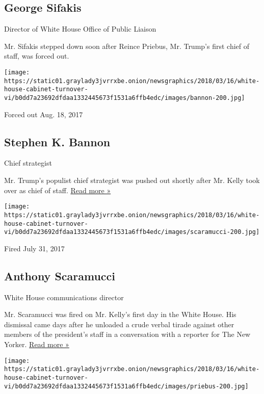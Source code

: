 \hypertarget{george-sifakis}{%
\subsection{George Sifakis}\label{george-sifakis}}

Director of White House Office of Public Liaison

Mr. Sifakis stepped down soon after Reince Priebus, Mr. Trump's first
chief of staff, was forced out.

\texttt{[image: https://static01.graylady3jvrrxbe.onion/newsgraphics/2018/03/16/white-house-cabinet-turnover-vi/b0dd7a23692dfdaa1332445673f1531a6ffb4edc/images/bannon-200.jpg]}

Forced out Aug. 18, 2017

\hypertarget{stephen-k-bannon}{%
\subsection{Stephen K. Bannon}\label{stephen-k-bannon}}

Chief strategist

Mr. Trump's populist chief strategist was pushed out shortly after Mr.
Kelly took over as chief of staff.
\href{https://www.nytimes3xbfgragh.onion/2017/08/18/us/politics/steve-bannon-trump-white-house.html}{Read
more »}

\texttt{[image: https://static01.graylady3jvrrxbe.onion/newsgraphics/2018/03/16/white-house-cabinet-turnover-vi/b0dd7a23692dfdaa1332445673f1531a6ffb4edc/images/scaramucci-200.jpg]}

Fired July 31, 2017

\hypertarget{anthony-scaramucci}{%
\subsection{Anthony Scaramucci}\label{anthony-scaramucci}}

White House communications director

Mr. Scaramucci was fired on Mr. Kelly's first day in the White House.
His dismissal came days after he unloaded a crude verbal tirade against
other members of the president's staff in a conversation with a reporter
for The New Yorker.
\href{https://www.nytimes3xbfgragh.onion/2017/07/31/us/politics/trump-white-house-obamacare-health.html}{Read
more »}

\texttt{[image: https://static01.graylady3jvrrxbe.onion/newsgraphics/2018/03/16/white-house-cabinet-turnover-vi/b0dd7a23692dfdaa1332445673f1531a6ffb4edc/images/priebus-200.jpg]}

